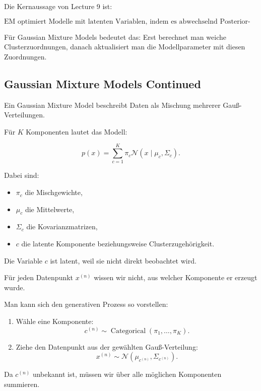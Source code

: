 \documentclass[11pt,a4paper]{scrartcl}
\begin{document}
\begin{answerbox}
    Die Kernaussage von Lecture 9 ist:

    \[
        \boxed{
            \text{EM optimiert Modelle mit latenten Variablen, indem es
            abwechselnd Posterior-Verteilungen berechnet und Parameter aktualisiert.}
        }
    \]

    Für Gaussian Mixture Models bedeutet das:
    Erst berechnet man weiche Clusterzuordnungen, danach aktualisiert man die
    Modellparameter mit diesen Zuordnungen.
\end{answerbox}

\subsection{Gaussian Mixture Models Continued}

\begin{notebox}
    Ein Gaussian Mixture Model beschreibt Daten als Mischung mehrerer
    Gauß-Verteilungen.

    Für \(K\) Komponenten lautet das Modell:

    \[
        p(x)
        =
        \sum_{c=1}^{K}
        \pi_c
        \mathcal{N}(x\mid \mu_c,\Sigma_c).
    \]

    Dabei sind:

    \begin{itemize}
        \item \(\pi_c\) die Mischgewichte,
        \item \(\mu_c\) die Mittelwerte,
        \item \(\Sigma_c\) die Kovarianzmatrizen,
        \item \(c\) die latente Komponente beziehungsweise Clusterzugehörigkeit.
    \end{itemize}
\end{notebox}

\begin{solutionbox}
    Die Variable \(c\) ist latent, weil sie nicht direkt beobachtet wird.

    Für jeden Datenpunkt \(x^{(n)}\) wissen wir nicht, aus welcher Komponente er
    erzeugt wurde.

    Man kann sich den generativen Prozess so vorstellen:

    \begin{enumerate}
        \item Wähle eine Komponente:
        \[
            c^{(n)} \sim \operatorname{Categorical}(\pi_1,\dots,\pi_K).
        \]

        \item Ziehe den Datenpunkt aus der gewählten Gauß-Verteilung:
        \[
            x^{(n)} \sim \mathcal{N}(\mu_{c^{(n)}},\Sigma_{c^{(n)}}).
        \]
    \end{enumerate}

    Da \(c^{(n)}\) unbekannt ist, müssen wir über alle möglichen Komponenten
    summieren.
\end{solutionbox}
\end{document}
